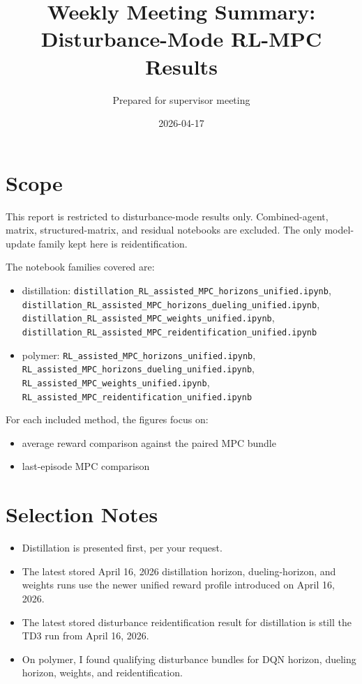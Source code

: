 \documentclass[11pt]{article}
\title{Weekly Meeting Summary: Disturbance-Mode RL-MPC Results}
\author{Prepared for supervisor meeting}
\date{2026-04-17}
\begin{document}
\maketitle

\section*{Scope}

This report is restricted to disturbance-mode results only. Combined-agent,
matrix, structured-matrix, and residual notebooks are excluded. The only
model-update family kept here is reidentification.

The notebook families covered are:
\begin{itemize}
\item distillation:
      \texttt{distillation\_RL\_assisted\_MPC\_horizons\_unified.ipynb},
      \texttt{distillation\_RL\_assisted\_MPC\_horizons\_dueling\_unified.ipynb},
      \texttt{distillation\_RL\_assisted\_MPC\_weights\_unified.ipynb},
      \texttt{distillation\_RL\_assisted\_MPC\_reidentification\_unified.ipynb}
\item polymer:
      \texttt{RL\_assisted\_MPC\_horizons\_unified.ipynb},
      \texttt{RL\_assisted\_MPC\_horizons\_dueling\_unified.ipynb},
      \texttt{RL\_assisted\_MPC\_weights\_unified.ipynb},
      \texttt{RL\_assisted\_MPC\_reidentification\_unified.ipynb}
\end{itemize}

For each included method, the figures focus on:
\begin{itemize}
\item average reward comparison against the paired MPC bundle
\item last-episode MPC comparison
\end{itemize}

\section*{Selection Notes}

\begin{itemize}
\item Distillation is presented first, per your request.
\item The latest stored April 16, 2026 distillation horizon, dueling-horizon,
      and weights runs use the newer unified reward profile introduced on
      April 16, 2026.
\item The latest stored disturbance reidentification result for distillation is
      still the TD3 run from April 16, 2026.
\item On polymer, I found qualifying disturbance bundles for DQN horizon,
      dueling horizon, weights, and reidentification.
\end{itemize}
\end{document}
